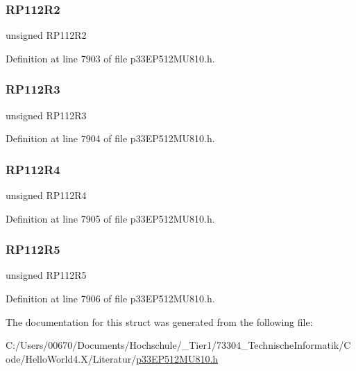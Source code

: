 \subsubsection{\texorpdfstring{R\+P112\+R2}{RP112R2}}
{\footnotesize\ttfamily unsigned R\+P112\+R2}



Definition at line 7903 of file p33\+E\+P512\+M\+U810.\+h.

\mbox{\label{structtag_r_p_o_r12_b_i_t_s_a054e4b50dd5708cc2c0d8489c761c168}} 
\subsubsection{\texorpdfstring{R\+P112\+R3}{RP112R3}}
{\footnotesize\ttfamily unsigned R\+P112\+R3}



Definition at line 7904 of file p33\+E\+P512\+M\+U810.\+h.

\mbox{\label{structtag_r_p_o_r12_b_i_t_s_a5942e6583059f524780015b897029ac1}} 
\subsubsection{\texorpdfstring{R\+P112\+R4}{RP112R4}}
{\footnotesize\ttfamily unsigned R\+P112\+R4}



Definition at line 7905 of file p33\+E\+P512\+M\+U810.\+h.

\mbox{\label{structtag_r_p_o_r12_b_i_t_s_a187168c44785904e874271f8d9efcbe4}} 
\subsubsection{\texorpdfstring{R\+P112\+R5}{RP112R5}}
{\footnotesize\ttfamily unsigned R\+P112\+R5}



Definition at line 7906 of file p33\+E\+P512\+M\+U810.\+h.



The documentation for this struct was generated from the following file\+:\begin{DoxyCompactItemize}
\item 
C\+:/\+Users/00670/\+Documents/\+Hochschule/\+\_\+\+Tier1/73304\+\_\+\+Technische\+Informatik/\+Code/\+Hello\+World4.\+X/\+Literatur/\hyperlink{p33_e_p512_m_u810_8h}{p33\+E\+P512\+M\+U810.\+h}\end{DoxyCompactItemize}
